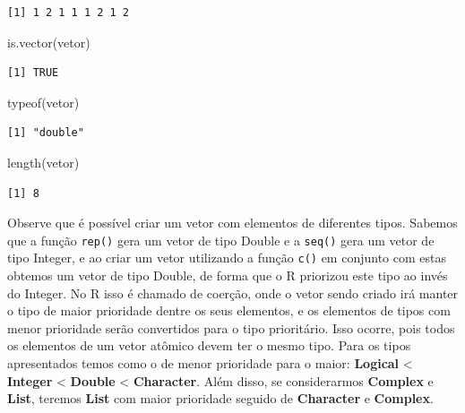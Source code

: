 \documentclass[
  letterpaper,
  DIV=11,
  numbers=noendperiod]{scrreprt}
\newenvironment{Shaded}{\begin{snugshade}}{\end{snugshade}}
\newcommand{\FunctionTok}[1]{\textcolor[rgb]{0.28,0.35,0.67}{#1}}
\newcommand{\NormalTok}[1]{\textcolor[rgb]{0.00,0.23,0.31}{#1}}
\begin{document}
\begin{verbatim}
[1] 1 2 1 1 1 2 1 2
\end{verbatim}

\begin{Shaded}
\begin{Highlighting}[]
\FunctionTok{is.vector}\NormalTok{(vetor)}
\end{Highlighting}
\end{Shaded}

\begin{verbatim}
[1] TRUE
\end{verbatim}

\begin{Shaded}
\begin{Highlighting}[]
\FunctionTok{typeof}\NormalTok{(vetor)}
\end{Highlighting}
\end{Shaded}

\begin{verbatim}
[1] "double"
\end{verbatim}

\begin{Shaded}
\begin{Highlighting}[]
\FunctionTok{length}\NormalTok{(vetor)}
\end{Highlighting}
\end{Shaded}

\begin{verbatim}
[1] 8
\end{verbatim}

Observe que é possível criar um vetor com elementos de diferentes tipos.
Sabemos que a função \texttt{rep()} gera um vetor de tipo Double e a
\texttt{seq()} gera um vetor de tipo Integer, e ao criar um vetor
utilizando a função \texttt{c()} em conjunto com estas obtemos um vetor
de tipo Double, de forma que o R priorizou este tipo ao invés do
Integer. No R isso é chamado de coerção, onde o vetor sendo criado irá
manter o tipo de maior prioridade dentre os seus elementos, e os
elementos de tipos com menor prioridade serão convertidos para o tipo
prioritário. Isso ocorre, pois todos os elementos de um vetor atômico
devem ter o mesmo tipo. Para os tipos apresentados temos como o de menor
prioridade para o maior: \textbf{Logical} \textless{} \textbf{Integer}
\textless{} \textbf{Double} \textless{} \textbf{Character}. Além disso,
se considerarmos \textbf{Complex} e \textbf{List}, teremos \textbf{List}
com maior prioridade seguido de \textbf{Character} e \textbf{Complex}.
\end{document}

